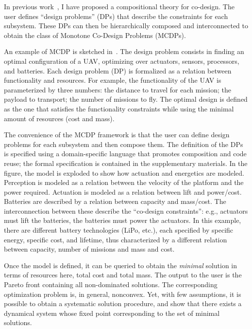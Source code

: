 \documentclass[twocolumn,english]{IEEEconf}
\theoremstyle{plain}
\theoremstyle{definition}
\theoremstyle{definition}
\theoremstyle{plain}
\newcommand{\colR}{\color[rgb]{0.555789,0.000000,0.000000}}
\newcommand{\colF}{\color[rgb]{0.094869,0.500000,0.000000}}
\newcommand{\R}[1]{{\colR #1}}
\newcommand{\F}[1]{{\colF #1}}
\begin{document}
In previous work~\cite{censi15monotone,censi15same,censi16codesign_sep16},
I have proposed a compositional theory for co-design. The user defines
``design problems'' (DPs) that describe the constraints for each
subsystem. These DPs can then be hierarchically composed and interconnected
to obtain the class of Monotone Co-Design Problems (MCDPs). 

An example of MCDP is sketched in~. The
design problem consists in finding an optimal configuration of a UAV,
optimizing over actuators, sensors, processors, and batteries. Each
design problem (DP) is formalized as a relation between \F{functionality}
and \R{resources}. For example, the functionality of the UAV is parameterized
by three numbers: the \F{distance to travel} for each mission; the
\F{payload to transport}; the \F{number of missions} to fly. The
optimal design is defined as the one that satisfies the functionality
constraints while using the minimal amount of \R{resources} (\R{cost}
and \R{mass}). 

The convenience of the MCDP framework is that the user can define
design problems for each subsystem and then compose them. The definition
of the DPs is specified using a domain-specific language that promotes
composition and code reuse; the formal specification is contained
in the supplementary materials. In the figure, the model is exploded
to show how actuation and energetics are modeled. Perception is modeled
as a relation between \F{the velocity of the platform} and the \R{power}
required. Actuation is modeled as a relation between \F{lift} and
\R{power}/\R{cost}. Batteries are described by a relation between
\F{capacity} and \R{mass}/\R{cost}. The interconnection between
these describe the ``co-design constraints'': e.g., actuators must
lift the batteries, the batteries must power the actuators. In this
example, there are different battery technologies (LiPo, etc.), each
specified by specific energy, specific cost, and lifetime, thus characterized
by a different relation between \F{capacity}, \F{number of missions}
and \R{mass} and \R{cost}. 

Once the model is defined, it can be queried to obtain the \emph{minimal}
solution in terms of resources \textemdash{} here, \R{total cost}
and \R{total mass}. The output to the user is the Pareto front containing
all non-dominated solutions. The corresponding optimization problem
is, in general, nonconvex. Yet, with few assumptions, it is possible
to obtain a systematic solution procedure, and show that there exists
a dynamical system whose fixed point corresponding to the set of minimal
solutions. 
\end{document}
